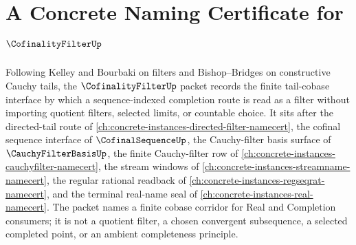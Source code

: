 \chapter{A Concrete Naming Certificate for $\CofinalityFilterUp$}
\label{ch:concrete-instances-cofinality-filter-namecert}

Following Kelley and Bourbaki on filters and Bishop--Bridges on constructive Cauchy tails, the $\CofinalityFilterUp$ packet records the finite tail-cobase interface by which a sequence-indexed completion route is read as a filter without importing quotient filters, selected limits, or countable choice. It sits after the directed-tail route of \autoref{ch:concrete-instances-directed-filter-namecert}, the cofinal sequence interface of $\CofinalSequenceUp$, the Cauchy-filter basis surface of $\CauchyFilterBasisUp$, the finite Cauchy-filter row of \autoref{ch:concrete-instances-cauchyfilter-namecert}, the stream windows of \autoref{ch:concrete-instances-streamname-namecert}, the regular rational readback of \autoref{ch:concrete-instances-regseqrat-namecert}, and the terminal real-name seal of \autoref{ch:concrete-instances-real-namecert}. The packet names a finite cobase corridor for Real and Completion consumers; it is not a quotient filter, a chosen convergent subsequence, a selected completed point, or an ambient completeness principle.

